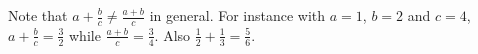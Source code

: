 Note that $a + \frac{b}{c} \neq \frac{a + b}{c}$ in general.
For instance with $a = 1$, $b = 2$ and $c = 4$, $a + \frac{b}{c} = \frac{3}{2}$ while $\frac{a + b}{c} = \frac{3}{4}$.
Also $\frac{1}{2} + \frac{1}{3} = \frac{5}{6}$.